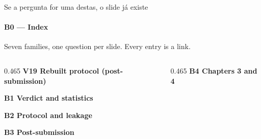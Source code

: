 \documentclass{beamer}
\begin{document}
\begin{frame}[noframenumbering]{Se a pergunta for uma destas, o slide já existe}
    \framesubtitle{B0 --- Index}
    \hypertarget{b0}{}
    \footnotesize
    Seven families, one question per slide. Every entry is a link.
    \smallskip

    \begin{columns}[T,onlytextwidth]
    \begin{column}{0.465\textwidth}
        \textbf{V19 \textbullet{} Rebuilt protocol (post-submission)}\\
        \hyperlink{v191}{}\hyperlink{v192}{}\hyperlink{v193}{}
        \smallskip

        \textbf{B1 \textbullet{} Verdict and statistics}\\
        \hyperlink{b11}{}\hyperlink{b12}{}\hyperlink{b13}{}\hyperlink{b14}{}\hyperlink{b15}{}\hyperlink{b16}{}
        \smallskip

        \textbf{B2 \textbullet{} Protocol and leakage}\\
        \hyperlink{b21}{}\hyperlink{b22}{}\hyperlink{b23}{}\hyperlink{b24}{}\hyperlink{b25}{}
        \smallskip

        \textbf{B3 \textbullet{} Post-submission}\\
        \hyperlink{bp1}{}\hyperlink{bq13}{}\hyperlink{bq14}{}\hyperlink{bq15}{}\\
        \hyperlink{bnom}{}\hyperlink{bkarpathy}{}\hyperlink{bmtlcheck}{}\hyperlink{bapxg}{}\hyperlink{bfuture}{}
    \end{column}
    \hfill
    \begin{column}{0.465\textwidth}
        \textbf{B4 \textbullet{} Chapters 3 and 4}\\
        \hyperlink{b4leak}{}\hyperlink{b4dgi}{}\hyperlink{b41}{}\hyperlink{b42}{}\hyperlink{b43}{}\hyperlink{b44}{}\hyperlink{b45}{}
        \smallskip


\end{column}
\end{columns}
\end{frame}
\end{document}
